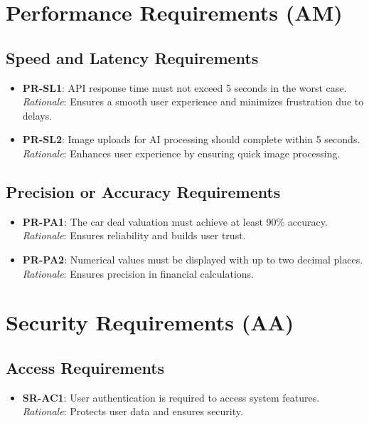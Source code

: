 \documentclass[]{article}
\begin{document}
\section{Performance Requirements (AM)}
\subsection{Speed and Latency Requirements}
\begin{itemize}
    \item \textbf{PR-SL1}: API response time must not exceed 5 seconds in the worst case. \\ 
    \textit{Rationale}: Ensures a smooth user experience and minimizes frustration due to delays.
    
    \item \textbf{PR-SL2}: Image uploads for AI processing should complete within 5 seconds. \\ 
    \textit{Rationale}: Enhances user experience by ensuring quick image processing.
\end{itemize}

\subsection{Precision or Accuracy Requirements}
\begin{itemize}
    \item \textbf{PR-PA1}: The car deal valuation must achieve at least 90\% accuracy. \\ 
    \textit{Rationale}: Ensures reliability and builds user trust.
    
    \item \textbf{PR-PA2}: Numerical values must be displayed with up to two decimal places. \\ 
    \textit{Rationale}: Ensures precision in financial calculations.
\end{itemize}

\section{Security Requirements (AA)}
\subsection{Access Requirements}
\begin{itemize}
    \item \textbf{SR-AC1}: User authentication is required to access system features. \\ 
    \textit{Rationale}: Protects user data and ensures security.
\end{itemize}
\end{document}

